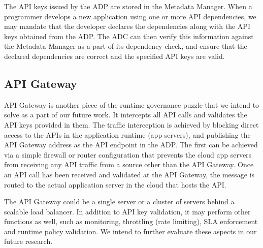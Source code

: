 The API keys issued by the ADP are stored in the Metadata Manager. When a programmer develops a new application
using one or more API dependencies, we may mandate that the developer declares the dependencies along with the API keys obtained from the ADP. The ADC
can then verify this information against the Metadata Manager as a part of its dependency check, and ensure that the declared dependencies are correct and 
the specified API keys are valid. %

\subsection{API Gateway}
API Gateway is another piece of the runtime governance puzzle that we intend to solve as a part of our future work. It intercepts all API calls and validates the API
keys provided in them. The traffic interception is achieved by blocking direct access to the APIs in the application runtime (app servers), and publishing the API 
Gateway address as the API endpoint in the ADP. The first can be achieved via a simple firewall or router configuration that prevents the cloud app servers from 
receiving any API traffic from a source other than the API Gateway. Once an API call has been received and validated at the API Gateway, the message is
routed to the actual application server in the cloud that hosts the API.

The API Gateway could be a single server or a cluster of servers behind a scalable load balancer. %
In addition to API key validation, it may perform other
functions as well, such as monitoring, throttling (rate limiting), SLA enforcement and runtime policy validation. We intend to further evaluate these aspects
in our future research.